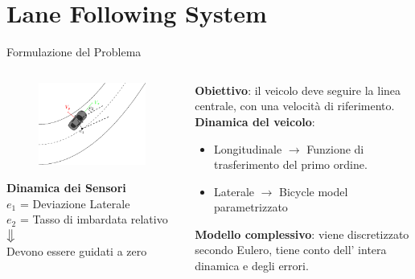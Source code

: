 \documentclass{beamer}
\begin{document}
	\section{Lane Following System \qquad{}}  %
	
	\begin{frame}{Formulazione del Problema}
		\vspace{-2.5em}
		\begin{columns}[onlytextwidth,T]
			\hspace{-2.5em}
			\begin{column}[c]{0.5\textwidth}
			\begin{figure}[!h]
			\centering
			\includegraphics[width=\columnwidth]{./images/laneFollowing/laneFollowingPres.pdf}
		\end{figure}
		\centering
		\textbf{Dinamica dei Sensori\\}
		$e_1$ = Deviazione Laterale\\
		$e_2$ = Tasso di imbardata relativo\\
		$\big\Downarrow$\\
		Devono essere guidati a zero
			\end{column}
			\begin{column}[c]{0.65\textwidth}
				\textbf{Obiettivo}: il veicolo deve seguire la linea centrale, con una velocità di riferimento.\\
				\vspace{2em}
				\textbf{Dinamica del veicolo}:
				\begin{itemize}
					\item Longitudinale $\rightarrow$ Funzione di trasferimento del primo ordine.
					\item Laterale $\rightarrow$ Bicycle model parametrizzato
				\end{itemize}
				\vspace{2em}
				\centering
				\textbf{Modello complessivo}: viene discretizzato secondo Eulero, tiene conto dell' intera dinamica e degli errori.
			\end{column}
		\end{columns}
		
		
	\end{frame}
	
\end{document}
